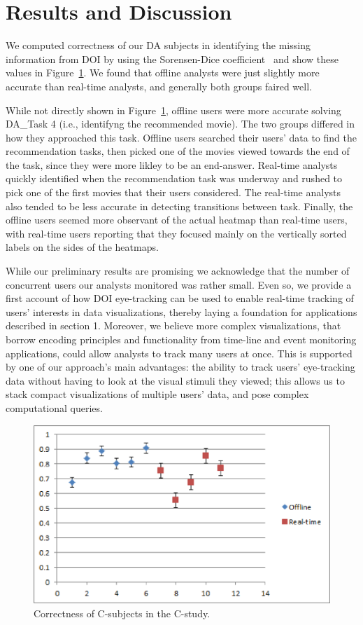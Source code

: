 ﻿\section{Results and Discussion}
We computed correctness of our DA subjects in identifying the missing information from DOI by using the Sorensen-Dice coefficient~\cite{sorensen1948method} and show these values in Figure~\ref{fig:Scatter}. We found that offline analysts were just slightly more accurate than real-time analysts, and generally both groups faired well. 

While not directly shown in Figure~\ref{fig:Scatter}, offline users were more accurate solving DA\_Task 4 (i.e., identifyng the recommended movie). The two groups differed in how they approached this task. Offline users searched their users' data to find the recommendation tasks, then picked one of the movies viewed towards the end of the task, since they were more likley to be an end-answer. Real-time analysts quickly identified when the recommendation task was underway and rushed to pick one of the first movies that their users considered. The real-time analysts also tended to be less accurate in detecting transitions between task. Finally, the offline users seemed more observant of the actual heatmap than real-time users, with real-time users reporting that they focused mainly on the vertically sorted labels on the sides of the heatmaps. 

While our preliminary results are promising we acknowledge that the number of concurrent users our analysts monitored was rather small. Even so, we provide a first account of how DOI eye-tracking can be used to enable real-time tracking of users' interests in data visualizations, thereby laying a foundation for applications described in section 1.  Moreover, we believe more complex visualizations, that borrow encoding principles and functionality from time-line and event monitoring applications, could allow analysts to track many users at once.  This is supported by one of our approach's main advantages: the ability to track users' eye-tracking data without having to look at the visual stimuli they viewed; this allows us to stack compact visualizations of multiple users' data, and pose complex computational queries. 


\begin{figure}[htb]
  \centering
  \includegraphics[width=0.9\linewidth]{images/Scatter.eps}
  \caption{Correctness of C-subjects in the C-study.}
	\label{fig:Scatter}
\end{figure} 

